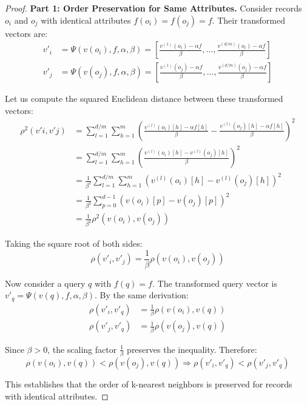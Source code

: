 \documentclass[numbers,sort]{article}
\begin{document}
\begin{proof}
\textbf{Part 1: Order Preservation for Same Attributes.}
Consider records $o_i$ and $o_j$ with identical attributes $f(o_i) = f(o_j) = f$. Their transformed vectors are:
\begin{align}
v'_i &= \Psi(v(o_i), f, \alpha, \beta) = \left[\frac{v^{(1)}(o_i) - \alpha f}{\beta}, \ldots, \frac{v^{(d/m)}(o_i) - \alpha f}{\beta}\right] \\
v'_j &= \Psi(v(o_j), f, \alpha, \beta) = \left[\frac{v^{(1)}(o_j) - \alpha f}{\beta}, \ldots, \frac{v^{(d/m)}(o_j) - \alpha f}{\beta}\right]
\end{align}

Let us compute the squared Euclidean distance between these transformed vectors:
\begin{align}
\rho^2(v'i, v'j) &= \sum_{l=1}^{d/m} \sum_{h=1}^{m} \left(\frac{v^{(l)}(o_i)[h] - \alpha f[h]}{\beta} - \frac{v^{(l)}(o_j)[h] - \alpha f[h]}{\beta}\right)^2 \\
&= \sum_{l=1}^{d/m} \sum_{h=1}^{m} \left(\frac{v^{(l)}(o_i)[h] - v^{(l)}(o_j)[h]}{\beta}\right)^2 \\
&= \frac{1}{\beta^2}\sum_{l=1}^{d/m} \sum_{h=1}^{m} \left(v^{(l)}(o_i)[h] - v^{(l)}(o_j)[h]\right)^2 \\
&= \frac{1}{\beta^2}\sum_{p=0}^{d-1} \left(v(o_i)[p] - v(o_j)[p]\right)^2 \\
&= \frac{1}{\beta^2}\rho^2(v(o_i), v(o_j))
\end{align}

Taking the square root of both sides:
\begin{equation}
\rho(v'_i, v'_j) = \frac{1}{\beta}\rho(v(o_i), v(o_j))
\end{equation}

Now consider a query $q$ with $f(q) = f$. The transformed query vector is $v'_q = \Psi(v(q), f, \alpha, \beta)$. By the same derivation:
\begin{align}
\rho(v'_i, v'_q) &= \frac{1}{\beta}\rho(v(o_i), v(q)) \\
\rho(v'_j, v'_q) &= \frac{1}{\beta}\rho(v(o_j), v(q))
\end{align}

Since $\beta > 0$, the scaling factor $\frac{1}{\beta}$ preserves the inequality. Therefore:
\begin{equation}
\rho(v(o_i), v(q)) < \rho(v(o_j), v(q)) \Rightarrow \rho(v'_i, v'_q) < \rho(v'_j, v'_q)
\end{equation}

This establishes that the order of k-nearest neighbors is preserved for records with identical attributes.


\end{proof}
\end{document}
